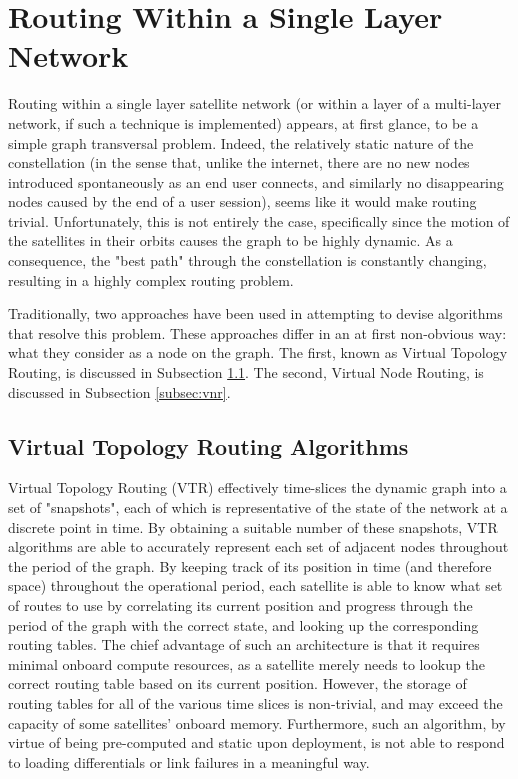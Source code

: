 
\section{Routing Within a Single Layer Network}\label{sec:singleLayer}
Routing within a single layer satellite network (or within a layer of a multi-layer network, if such a technique is implemented) appears, at first glance, to be a simple graph transversal problem. Indeed, the relatively static nature of the constellation (in the sense that, unlike the internet, there are no new nodes introduced spontaneously as an end user connects, and similarly no disappearing nodes caused by the end of a user session), seems like it would make routing trivial. Unfortunately, this is not entirely the case, specifically since the motion of the satellites in their orbits causes the graph to be highly dynamic. As a consequence, the "best path" through the constellation is constantly changing, resulting in a highly complex routing problem.

Traditionally, two approaches have been used in attempting to devise algorithms that resolve this problem. These approaches differ in an at first non-obvious way: what they consider as a node on the graph. The first, known as Virtual Topology Routing, is discussed in Subsection \ref{subsec:vtr}. The second, Virtual Node Routing, is discussed in Subsection \ref{subsec:vnr}.

\subsection{Virtual Topology Routing Algorithms}\label{subsec:vtr}
Virtual Topology Routing (VTR) effectively time-slices the dynamic graph into a set of "snapshots", each of which is representative of the state of the network at a discrete point in time. By obtaining a suitable number of these snapshots, VTR algorithms are able to accurately represent each set of adjacent nodes throughout the period of the graph. By keeping track of its position in time (and therefore space) throughout the operational period, each satellite is able to know what set of routes to use by correlating its current position and progress through the period of the graph with the correct state, and looking up the corresponding routing tables. The chief advantage of such an architecture is that it requires minimal onboard compute resources, as a satellite merely needs to lookup the correct routing table based on its current position. However, the storage of routing tables for all of the various time slices is non-trivial, and may exceed the capacity of some satellites' onboard memory. Furthermore, such an algorithm, by virtue of being pre-computed and static upon deployment, is not able to respond to loading differentials or link failures in a meaningful way.

